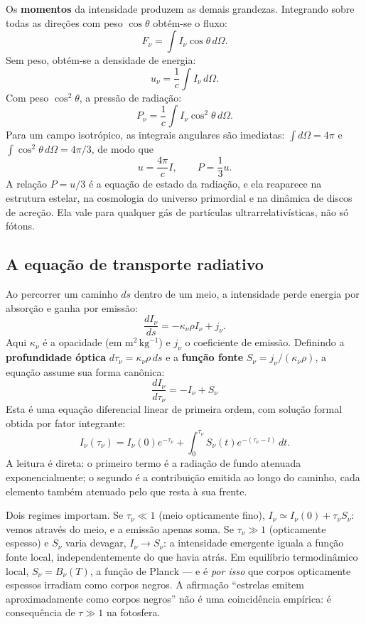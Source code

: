 \documentclass[11pt,a4paper]{article}
\begin{document}
Os \textbf{momentos} da intensidade produzem as demais grandezas. Integrando sobre todas as direções com peso $\cos\theta$ obtém-se o fluxo:
\[
F_\nu=\int I_\nu\cos\theta\,d\Omega.
\]
Sem peso, obtém-se a densidade de energia:
\[
u_\nu=\frac{1}{c}\int I_\nu\,d\Omega.
\]
Com peso $\cos^{2}\theta$, a pressão de radiação:
\[
P_\nu=\frac{1}{c}\int I_\nu\cos^{2}\theta\,d\Omega.
\]
Para um campo isotrópico, as integrais angulares são imediatas: $\int d\Omega=4\pi$ e $\int\cos^{2}\theta\,d\Omega=4\pi/3$, de modo que
\[
u=\frac{4\pi}{c}I,\qquad P=\frac{1}{3}u.
\]
A relação $P=u/3$ é a equação de estado da radiação, e ela reaparece na estrutura estelar, na cosmologia do universo primordial e na dinâmica de discos de acreção. Ela vale para qualquer gás de partículas ultrarrelativísticas, não só fótons.

\subsection*{A equação de transporte radiativo}

Ao percorrer um caminho $ds$ dentro de um meio, a intensidade perde energia por absorção e ganha por emissão:
\[
\frac{dI_\nu}{ds}=-\kappa_\nu\rho I_\nu+j_\nu.
\]
Aqui $\kappa_\nu$ é a opacidade (em $\mathrm{m^2\,kg^{-1}}$) e $j_\nu$ o coeficiente de emissão. Definindo a \textbf{profundidade óptica} $d\tau_\nu=\kappa_\nu\rho\,ds$ e a \textbf{função fonte} $S_\nu=j_\nu/(\kappa_\nu\rho)$, a equação assume sua forma canônica:
\[
\boxed{\ \frac{dI_\nu}{d\tau_\nu}=-I_\nu+S_\nu\ }
\]
Esta é uma equação diferencial linear de primeira ordem, com solução formal obtida por fator integrante:
\[
I_\nu(\tau_\nu)=I_\nu(0)e^{-\tau_\nu}+\int_0^{\tau_\nu}S_\nu(t)e^{-(\tau_\nu-t)}\,dt.
\]
A leitura é direta: o primeiro termo é a radiação de fundo atenuada exponencialmente; o segundo é a contribuição emitida ao longo do caminho, cada elemento também atenuado pelo que resta à sua frente.

Dois regimes importam. Se $\tau_\nu\ll1$ (meio opticamente fino), $I_\nu\simeq I_\nu(0)+\tau_\nu S_\nu$: vemos através do meio, e a emissão apenas soma. Se $\tau_\nu\gg1$ (opticamente espesso) e $S_\nu$ varia devagar, $I_\nu\to S_\nu$: a intensidade emergente iguala a função fonte local, independentemente do que havia atrás. Em equilíbrio termodinâmico local, $S_\nu=B_\nu(T)$, a função de Planck --- e é \emph{por isso} que corpos opticamente espessos irradiam como corpos negros. A afirmação ``estrelas emitem aproximadamente como corpos negros'' não é uma coincidência empírica: é consequência de $\tau\gg1$ na fotosfera.
\end{document}
